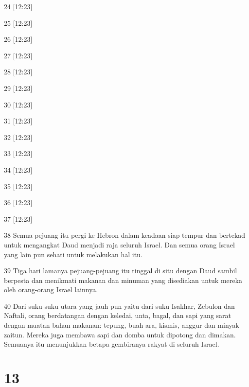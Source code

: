 \par 24 [12:23]
\par 25 [12:23]
\par 26 [12:23]
\par 27 [12:23]
\par 28 [12:23]
\par 29 [12:23]
\par 30 [12:23]
\par 31 [12:23]
\par 32 [12:23]
\par 33 [12:23]
\par 34 [12:23]
\par 35 [12:23]
\par 36 [12:23]
\par 37 [12:23]
\par 38 Semua pejuang itu pergi ke Hebron dalam keadaan siap tempur dan bertekad untuk mengangkat Daud menjadi raja seluruh Israel. Dan semua orang Israel yang lain pun sehati untuk melakukan hal itu.
\par 39 Tiga hari lamanya pejuang-pejuang itu tinggal di situ dengan Daud sambil berpesta dan menikmati makanan dan minuman yang disediakan untuk mereka oleh orang-orang Israel lainnya.
\par 40 Dari suku-suku utara yang jauh pun yaitu dari suku Isakhar, Zebulon dan Naftali, orang berdatangan dengan keledai, unta, bagal, dan sapi yang sarat dengan muatan bahan makanan: tepung, buah ara, kismis, anggur dan minyak zaitun. Mereka juga membawa sapi dan domba untuk dipotong dan dimakan. Semuanya itu menunjukkan betapa gembiranya rakyat di seluruh Israel.

\chapter{13}

